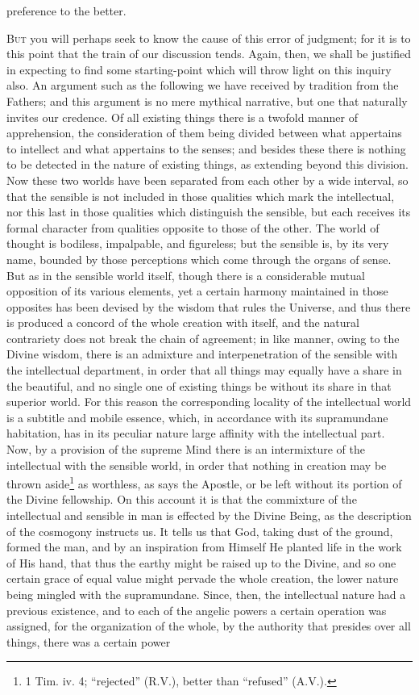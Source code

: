 preference to the better.


\textsc{But} you will perhaps seek to know the cause of this error of judgment; for it is to this point that the train of our discussion tends. Again, then, we shall be justified in expecting to find some starting-point which will throw light on this inquiry also. An argument such as the following we have received by tradition from the Fathers; and this argument is no mere mythical narrative, but one that naturally invites our credence. Of all existing things there is a twofold manner of apprehension, the consideration of them being divided between what appertains to intellect and what appertains to the senses; and besides these there is nothing to be detected in the nature of existing things, as extending beyond this division. Now these two worlds have been separated from each other by a wide interval, so that the sensible is not included in those qualities which mark the intellectual, nor this last in those qualities which distinguish the sensible, but each receives its formal character from qualities opposite to those of the other. The world of thought is bodiless, impalpable, and figureless; but the sensible is, by its very name, bounded by those perceptions which come through the organs of sense. But as in the sensible world itself, though there is a considerable mutual opposition of its various elements, yet a certain harmony maintained in those opposites has been devised by the wisdom that rules the Universe, and thus there is produced a concord of the whole creation with itself, and the natural contrariety does not break the chain of agreement; in like manner, owing to the Divine wisdom, there is an admixture and interpenetration of the sensible with the intellectual department, in order that all things may equally have a share in the beautiful, and no single one of existing things be without its share in that superior world. For this reason the corresponding locality of the intellectual world is a subtitle and mobile essence, which, in accordance with its supramundane habitation, has in its peculiar nature large affinity with the intellectual part. Now, by a provision of the supreme Mind there is an intermixture of the intellectual with the sensible world, in order that nothing in creation may be thrown aside\footnote{1 Tim. iv. 4; “rejected” (R.V.), better than “refused” (A.V.).} as worthless, as says the Apostle, or be left without its portion of the Divine fellowship. On this account it is that the commixture of the intellectual and sensible in man is effected by the Divine Being, as the description of the cosmogony instructs us. It tells us that God, taking dust of the ground, formed the man, and by an inspiration from Himself He planted life in the work of His hand, that thus the earthy might be raised up to the Divine, and so one certain grace of equal value might pervade the whole creation, the lower nature being mingled with the supramundane. Since, then, the intellectual nature had a previous existence, and to each of the angelic powers a certain operation was assigned, for the organization of the whole, by the authority that presides over all things, there was a certain power 